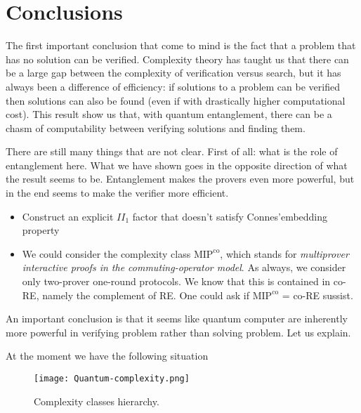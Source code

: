 \section*{Conclusions}

The first important conclusion that come to mind is the fact that a problem that has no solution can be verified. Complexity theory has taught us that there can be a large gap between the complexity of verification versus search, but it has always been a difference of efficiency: if solutions to a problem can be verified then solutions can also be found (even if with drastically higher computational cost). This result show us that, with quantum entanglement, there can be a chasm of computability between verifying solutions and finding them.


There are still many things that are not clear. First of all: what is the role of entanglement here. What we have shown goes in the opposite direction of what the result seems to be. Entanglement makes the provers even more powerful, but in the end seems to make the verifier more efficient.
\begin{itemize}

    \item Construct an explicit $II_1$ factor that doesn't satisfy Connes'embedding property
    \item We could consider the complexity class $\text{MIP}^\text{co}$, which stands for \emph{multiprover interactive proofs in the commuting-operator model}. As always, we consider only two-prover one-round protocols. We know that this is contained in co-RE, namely the complement of RE. One could ask if $\text{MIP}^\text{co}$ = co-RE sussist.
    
\end{itemize}

An important conclusion is that it seems like quantum computer are inherently more powerful in verifying problem rather than solving problem. Let us explain.

At the moment we have the following situation

\begin{figure}[htb]
    \texttt{[image: Quantum-complexity.png]}
    \centering
    \caption{Complexity classes hierarchy.}
    \end{figure}